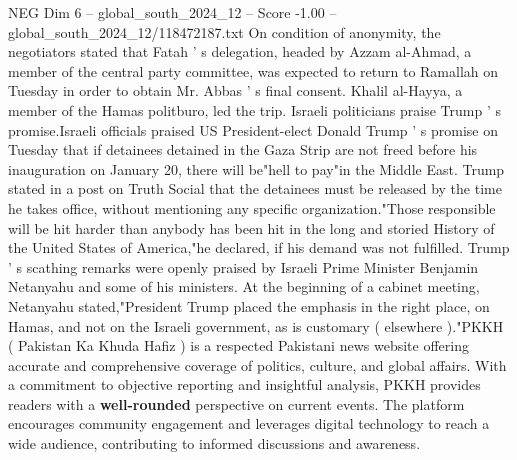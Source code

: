 \begin{textsample}{NEG Dim 6 – global\_south\_2024\_12 – Score -1.00 – global\_south\_2024\_12/118472187.txt}
On condition of anonymity, the negotiators stated that Fatah ' s delegation, headed by Azzam al-Ahmad, a member of the central party committee, was expected to return to Ramallah on Tuesday in order to obtain Mr.
Abbas ' s final consent.
Khalil al-Hayya, a member of the Hamas politburo, led the trip.
Israeli politicians praise Trump ' s promise.Israeli officials praised US President-elect Donald Trump ' s promise on Tuesday that if detainees detained in the Gaza Strip are not freed before his inauguration on January 20, there will be"hell to pay"in the Middle East.
Trump stated in a post on Truth Social that the detainees must be released by the time he takes office, without mentioning any specific organization."Those responsible will be hit harder than anybody has been hit in the long and storied History of the United States of America,"he declared, if his demand was not fulfilled.
Trump ' s scathing remarks were openly praised by Israeli Prime Minister Benjamin Netanyahu and some of his ministers.
At the beginning of a cabinet meeting, Netanyahu stated,"President Trump placed the emphasis in the right place, on Hamas, and not on the Israeli government, as is customary ( elsewhere )."PKKH ( Pakistan Ka Khuda Hafiz ) is a respected Pakistani news website offering accurate and comprehensive coverage of politics, culture, and global affairs.
With a commitment to objective reporting and insightful analysis, PKKH provides readers with a \textbf{well-rounded} perspective on current events.
The platform encourages community engagement and leverages digital technology to reach a wide audience, contributing to informed discussions and awareness.

\end{textsample}

